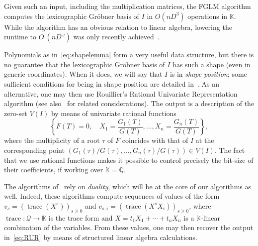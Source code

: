 \documentclass[12pt]{article}
\newcommand{\trace}{\operatorname{trace}}
\newcommand{\lf}{X}
\newcommand{\residueI}{\mathscr{Q}}
\def\Q {\ensuremath{\mathbb{Q}}}
\def\K{\mathbb{K}}
\def\K {\ensuremath{\mathbb{K}}}
\begin{document}
Given such an input, including the multiplication matrices, the FGLM
algorithm~\cite{FaGiLaMo93} computes the lexicographic Gr\"obner basis
of $I$ in $O(nD^3)$ operations in $\K$.  While the algorithm has an
obvious relation to linear algebra, lowering the runtime to
$O\tilde{~}(nD^\omega)$ was only recently
achieved~\cite{FaGaHuRe13,FaGaHuRe14,Neiger16}.

Polynomials as in~\cref{eq:shapelemma} form a very useful data
structure, but there is no guarantee that the lexicographic Gr\"obner
basis of $I$ has such a shape (even in generic coordinates). When it does, we will say that $I$ is
in {\em shape position}; some sufficient conditions for being in shape
position are detailed in~\cite{BeMoMaTr94}.  As an alternative, one
may then use Rouillier's Rational Univariate Representation algorithm
\cite{Rouillier99} (see also~\cite{AlBeRoWo94,BeWo96} for related
considerations). The output is a description of the zero-set $V(I)$ by
means of univariate rational functions
\begin{equation}\label{eq:RUR}
 \left\{  F(T)=0, \quad X_1 = \frac{G_1(T)}{G(T)}, \dots,X_n = \frac{G_n(T)}{G(T)} \right\},
\end{equation}
where the multiplicity of a root $\tau$ of $F$ coincides with that of
$I$ at the corresponding point
$(G_1(\tau)/G(\tau),\dots,G_n(\tau)/G(\tau)) \in V(I)$. The fact that
we use rational functions makes it possible to control
precisely the bit-size of their coefficients, if working over $\K=\Q$.

The algorithms of~\cite{AlBeRoWo94, BeWo96, Rouillier99} rely on
\emph{duality}, which will be at the core of our algorithms as well.
Indeed, these algorithms compute sequences of values of the form
$v_s=(\trace(\lf^s))_{s \ge 0}$ and 
$v_{s,i}=(\trace(\lf^s X_i))_{s \ge 0}$, where $\trace: \residueI \to \K$ is the trace 
form and $\lf=t_1 X_1 + \cdots + t_n X_n$ is  a $\K$-linear combination of the variables.
From these values, one may then recover the output in~\cref{eq:RUR} by means
of structured linear algebra calculations.
\end{document}
